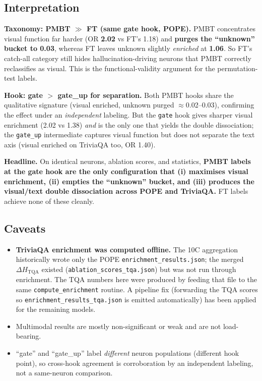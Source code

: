 \documentclass[11pt,a4paper]{article}
\begin{document}
\subsection{Interpretation}

\textbf{Taxonomy: PMBT $\gg$ FT (same gate hook, POPE).}
PMBT concentrates visual function far harder (OR \textbf{2.02} vs FT's 1.18) and
\textbf{purges the ``unknown'' bucket to 0.03}, whereas FT leaves unknown
slightly \emph{enriched} at \textbf{1.06}. So FT's catch-all category still hides
hallucination-driving neurons that PMBT correctly reclassifies as visual. This is
the functional-validity argument for the permutation-test labels.

\textbf{Hook: gate $>$ gate\_up for separation.}
Both PMBT hooks share the qualitative signature (visual enriched, unknown
purged $\approx$0.02--0.03), confirming the effect under an \emph{independent}
labeling. But the \texttt{gate} hook gives sharper visual enrichment (2.02 vs
1.38) \emph{and} is the only one that yields the double dissociation; the
\texttt{gate\_up} intermediate captures visual function but does not separate
the text axis (visual enriched on TriviaQA too, OR 1.40).

\textbf{Headline.}
On identical neurons, ablation scores, and statistics, \textbf{PMBT labels at the
gate hook are the only configuration that (i) maximises visual enrichment, (ii)
empties the ``unknown'' bucket, and (iii) produces the visual/text double
dissociation across POPE and TriviaQA.} FT labels achieve none of these cleanly.

\subsection{Caveats}
\begin{itemize}
\item \textbf{TriviaQA enrichment was computed offline.} The 10C aggregation
historically wrote only the POPE \texttt{enrichment\_results.json}; the merged
$\Delta H_{\text{TQA}}$ existed (\texttt{ablation\_scores\_tqa.json}) but was not
run through enrichment. The TQA numbers here were produced by feeding that file
to the same \texttt{compute\_enrichment} routine. A pipeline fix (forwarding the
TQA scores so \texttt{enrichment\_results\_tqa.json} is emitted automatically)
has been applied for the remaining models.
\item Multimodal results are mostly non-significant or weak and are not load-bearing.
\item ``gate'' and ``gate\_up'' label \emph{different} neuron populations
(different hook point), so cross-hook agreement is corroboration by an
independent labeling, not a same-neuron comparison.
\end{itemize}
\end{document}
